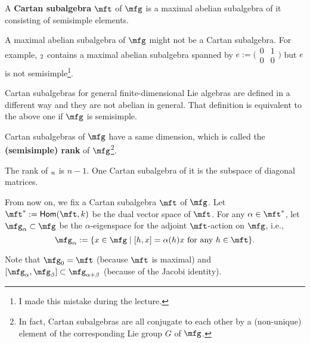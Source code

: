 \begin{defn}
	A \textbf{Cartan subalgebra} $\mft$ of $\mfg$ is a maximal abelian subalgebra of it consisting of semisimple elements.
\end{defn}

\begin{warn}
	A maximal abelian subalgebra of $\mfg$ might not be a Cartan subalgebra. For example, $\sl_2$ contains a maximal abelian subalgebra spanned by $e:=\big(\begin{smallmatrix} 0 & 1\\ 0 & 0
	\end{smallmatrix}\big)$ but $e$ is not semisimple\footnote{
		I made this mistake during the lecture.}.


\end{warn}

\begin{warn}
	Cartan subalgebras for general finite-dimensional Lie algebras are defined in a different way and they are not abelian in general. That definition is equivalent to the above one if $\mfg$ is semisimple.
\end{warn}

\begin{thm}
	Cartan subalgebras of $\mfg$ have a same dimension, which is called the \textbf{(semisimple) rank} of $\mfg$\footnote{
		In fact, Cartan subalgebras are all conjugate to each other by a (non-unique) element of the corresponding Lie group $G$ of $\mfg$.
	}. 
\end{thm}

\begin{exam}
	\label{exam-Cartan-sln}
	The rank of $\sl_n$ is $n-1$. One Cartan subalgebra of it is the subspace of diagonal matrices.
\end{exam}

\begin{notn}
	From now on, we fix a Cartan subalgebra $\mft$ of $\mfg$. Let $\mft^*:=\mathsf{Hom}(\mft,k)$ be the dual vector space of $\mft$. For any $\alpha\in \mft^*$, let $\mfg_\alpha \subset \mfg$ be the $\alpha$-eigenspace for the adjoint $\mft$-action on $\mfg$, i.e.,
	\[
		\mfg_\alpha:= \{ x\in \mfg\; \vert\; [h,x] = \alpha(h)x \textrm{ for any }h\in \mft\}.
	\]
\end{notn}

\begin{rem}
	Note that $\mfg_0 = \mft$ (because $\mft$ is maximal) and $[\mfg_\alpha,\mfg_\beta] \subset \mfg_{\alpha+\beta}$ (because of the Jacobi identity).
\end{rem}


